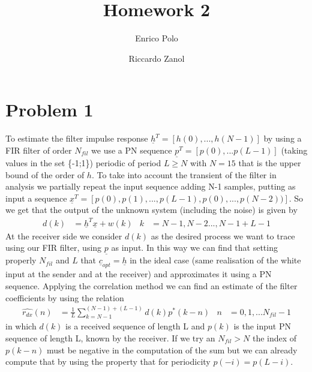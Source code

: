 \documentclass{article}
\author{Enrico Polo \and Riccardo Zanol}
\title{Homework 2}
\renewcommand{\vec}[1]{\underline{#1}}
\begin{document}
\maketitle
\section*{Problem 1}
To estimate the filter impulse response $\vec{h}^T = [h(0), ..., h(N-1)]$ by using a FIR filter of order $N_{fil}$ we use a PN sequence $\vec{p}^T = [p(0),...p(L-1)]$ (taking values in the set \{-1;1\}) periodic of period $L\geq N$ with $N=15$ that is the upper bound of the order of $h$. To take into account the transient of the filter in analysis we partially repeat the input sequence adding N-1 samples, putting as input a sequence $\vec{x}^T = [p(0), p(1),...,p(L-1),p(0),...,p(N-2))]$. So we get that the output of the unknown system (including the noise) is given by 
\begin{align*}
d(k)& = \vec{h}^T \vec{x} + w(k)&  k& = N-1,N-2...,N-1+L-1
\end{align*}
At the receiver side we consider $d(k)$ as the desired process we want to trace using our FIR filter, using $\vec{p}$ as input. In this way we can find that setting properly $N_{fil}$ and $L$ that $\vec{c}_{opt} = \vec{h}$ in the ideal case (same realisation of the white input at the sender and at the receiver) and approximates it using a PN sequence. 
\newline Applying the correlation method we can find an estimate of the filter coefficients by using the relation 
\begin{align*}
\hat{r_{dx}}(n) &= \frac{1}{L} \sum_{k=N-1}^{(N-1) + (L-1)} {d(k)p^*(k-n)} & n&=0,1,...N_{fil} -1
\end{align*}
in which $d(k)$ is a received sequence of length L and $p(k)$ is the input PN sequence of length L, known by the receiver. If we try an $N_{fil} > N$ the index of $p(k-n)$ must be negative in the computation of the sum but we can already compute that by using the property that for periodicity $p(-i) = p(L-i)$. 
\end{document}
